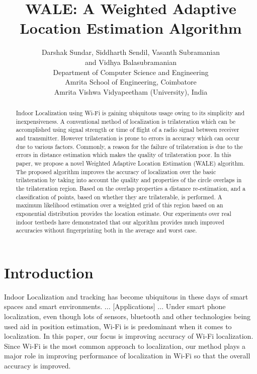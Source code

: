 \documentclass[twocolumn, 11pt]{IEEEtran}
\begin{document}
%
\title{\vspace{-0.5in} WALE: A Weighted Adaptive Location Estimation Algorithm}
\author{Darshak Sundar, Siddharth Sendil, Vasanth Subramanian\\ and Vidhya Balasubramanian \\Department of Computer Science and Engineering\\Amrita School of Engineering, Coimbatore\\ Amrita Vishwa Vidyapeetham (University), India}
\maketitle


\begin{abstract}

Indoor Localization using Wi-Fi is gaining ubiquitous usage owing to its simplicity and inexpensiveness. A conventional method of localization is trilateration which can be accomplished using signal strength or time of flight of a radio signal between receiver and transmitter. However trilateration is prone to errors in accuracy which can occur due to various factors. Commonly, a reason for the failure of trilateration is due to the errors in distance estimation which makes the quality of trilateration poor. In this paper, we propose a novel  Weighted Adaptive Location Estimation (WALE) algorithm. The proposed algorithm improves the accuracy of localization over the basic trilateration by taking into account the quality and properties of the circle overlaps in the trilateration region. Based on the overlap properties a distance re-estimation, and a classification of points, based on whether they are trilaterable, is performed. A maximum likelihood estimation over a weighted grid of this region based on an exponential distribution provides the location estimate. Our experiments over real indoor testbeds have demonstrated that our algorithm provides much improved accuracies without fingerprinting both in the average and worst case. 
\end{abstract}

\section{Introduction}
Indoor Localization and tracking has become ubiquitous in these days of smart spaces and smart environments. ... [Applications] ... Under smart phone localization, even though lots of sensors, bluetooth and other technologies being used aid in position estimation, Wi-Fi is is predominant when it comes to localization. In this paper, our focus is improving accuracy of Wi-Fi localization. Since Wi-Fi is the most common approach to localization, our method plays a major role in improving performance of localization in Wi-Fi so that the overall accuracy is improved.
\end{document}
